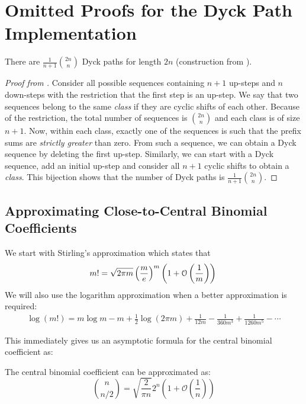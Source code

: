 \section{Omitted Proofs for the Dyck Path Implementation}%
\label{sec:dyck_appendix}

\begin{theorem}
\label{thm:number_of_dyck_paths}
There are $\frac{1}{n+1}\binom{2n}{n}$ Dyck paths for length $2n$ (construction from \cite{catalan_book}).
\end{theorem}
\begin{proof}[Proof from \cite{catalan_book}]
Consider all possible sequences containing $n+1$ up-steps and $n$ down-steps with the restriction that the first step is an up-step.
We say that two sequences belong to the same \emph{class} if they are cyclic shifts of each other.
Because of the restriction, the total number of sequences is $\binom{2n}{n}$ and each class is of size $n+1$.
Now, within each class, exactly one of the sequences is such that the prefix sums are \emph{strictly greater} than zero.
From such a sequence, we can obtain a Dyck sequence by deleting the first up-step.
Similarly, we can start with a Dyck sequence, add an initial up-step and consider all $n+1$ cyclic shifts to obtain a \emph{class}.
This bijection shows that the number of Dyck paths is $ \frac{1}{n+1} \binom{2n}{n}$.
\end{proof}



\subsection{Approximating Close-to-Central Binomial Coefficients}%
\label{sec:approximating_close_to_central_binomial_coefficients}
We start with Stirling's approximation which states that
\[
m! = \sqrt{2\pi m}\left( \frac me\right)^m\left( 1 + \mathcal O\left( \frac 1m\right)\right)\\
\]
We will also use the logarithm approximation when a better approximation is required:
\begin{align}
    \label{eq:log_factorial_approximation}
\log (m!) = m\log m -m + \frac 12 \log(2\pi m) + \frac{1}{12m} - \frac{1}{360m^3} + \frac{1}{1260m^5} - \cdots
\end{align}

This immediately gives us an asymptotic formula for the central binomial coefficient as:
\begin{lemma}
\label{lem:central_binomial_coefficient}
The central binomial coefficient can be approximated as:
\[
\binom{n}{n/2} = \sqrt{\frac{2}{\pi n}}2^n\left( 1 + \mathcal O\left( \frac 1n\right)\right)
\]
\end{lemma}

